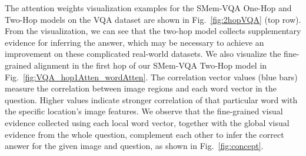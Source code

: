 The attention weights visualization examples for the SMem-VQA One-Hop and Two-Hop models on the VQA dataset are shown in Fig.~\ref{fig:2hopVQA} (top row). From the visualization, we can see that the two-hop model collects supplementary evidence for inferring the answer, which may be necessary to achieve an improvement on these complicated real-world datasets. We also visualize the fine-grained alignment in the first hop of our SMem-VQA Two-Hop model in Fig.~\ref{fig:VQA_hop1Atten_wordAtten}. 
The correlation vector values (blue bars) measure the correlation between image regions and each word vector in the question. Higher values indicate stronger correlation of that particular word with the specific location's image features. We observe that the fine-grained visual evidence collected using each local word vector, together with the global visual evidence from the whole question, complement each other to infer the correct answer for the given image and question, as shown in Fig.~\ref{fig:concept}.


